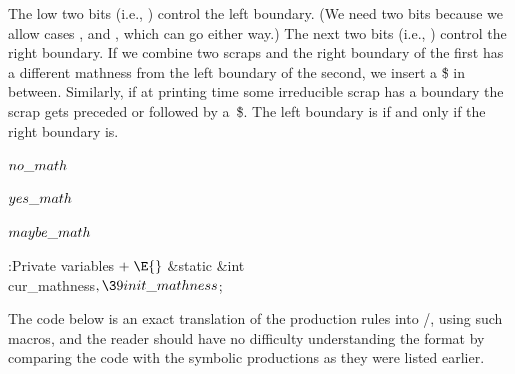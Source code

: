 The low two bits (i.e., ) control the left
boundary.
(We need two bits because we allow cases , 
and
, which can go either way.)
The next two bits (i.e., ) control the right boundary.
If we combine two scraps and the right boundary of the first has
a different mathness from the left boundary of the second, we
insert a \.{\$} in between.  Similarly, if at printing time some
irreducible scrap has a  boundary the scrap gets preceded
or followed by a~\.{\$}. The left boundary is  if and
only if the right boundary is.

\Y\B\4\D$\\{no\_math}$ \5
\par
\B\4\D$\\{yes\_math}$ \5
\par
\B\4\D$\\{maybe\_math}$ \5
\par
\Y\B\4:Private variables\X${}\mathrel+\E{}$\6
\&{static} \&{int} \\{cur\_mathness}${},\39\\{init\_mathness}{}$;\par
\fi

The code below is an exact translation of the production rules into
\CEE/, using such macros, and the reader should have no difficulty
understanding the format by comparing the code with the symbolic
productions as they were listed earlier.

